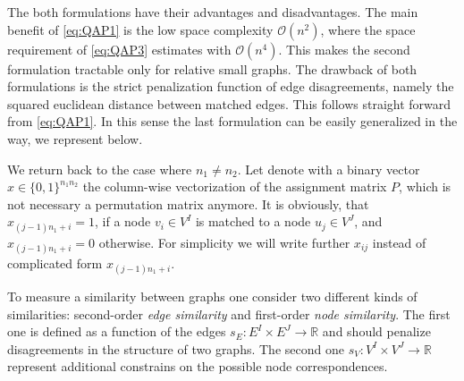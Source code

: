The both formulations have their advantages and disadvantages. The main benefit of \eqref{eq:QAP1} is the low space complexity $\mathcal O(n^2)$, where the space requirement of \eqref{eq:QAP3} estimates with $\mathcal O(n^4)$. This makes the second formulation tractable only for relative small graphs. The drawback of both formulations is the strict penalization function of edge disagreements, namely the squared euclidean distance between matched edges. This follows straight forward from \eqref{eq:QAP1}. In this sense the last formulation can be easily generalized in the way, we represent below. 

We return back to the case where $n_1\not=n_2$. Let denote with a binary vector $x\in \{0,1\}^{n_1n_2}$ the column-wise vectorization of the assignment matrix $P$, which is not necessary a permutation matrix anymore. It is obviously, that $x_{(j-1)n_1+i}=1$, if a node $v_i\in V^I$ is matched to a node $u_j\in V^J$, and $x_{(j-1)n_1+i}=0$ otherwise. For simplicity we will write further $x_{ij}$ instead of complicated form $x_{(j-1)n_1+i}$.
 


To measure a similarity between graphs one consider two different kinds of similarities: second-order \emph{edge similarity} and first-order \emph{node similarity}. The first one is defined as a function of the edges $s_E:E^I\times E^J\rightarrow\mathbb{R}$ and should penalize disagreements in the structure of two graphs. The second one $s_V:V^I\times V^J\rightarrow\mathbb{R}$ represent additional constrains on the possible node correspondences.


